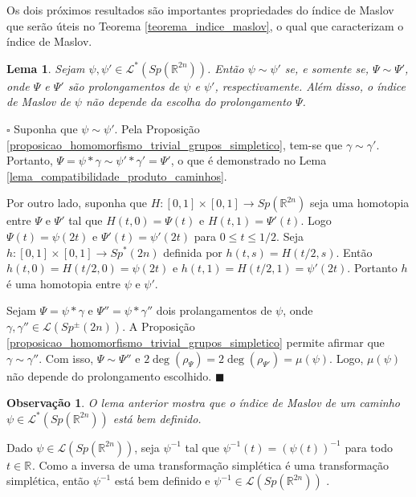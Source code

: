 \documentclass[12pt]{book}
\newtheorem{lema}[teorema]{Lema}
\newtheorem{observacao}[teorema]{Observação}
\newenvironment{prova}[1]{$\square$ #1}{\hfill$\blacksquare$}
\newcommand{\caminhos}{\mathcal{L}}
\newcommand{\dominioMaslov}{\caminhos^{*}(\gruposimpletico{\real{2n}})}
\newcommand{\gruposimpletico}[1]{Sp(#1)}
\newcommand{\gruposimpleticonaodegenerado}[1]{Sp^{#1}(2n)}
\newcommand{\intervalo}{[0,1]}
\newcommand{\real}[1]{\mathbb{R}^{#1}}
\newcommand{\reta}{\real{}}
\begin{document}
	Os dois próximos resultados são importantes propriedades do índice de Maslov que serão úteis no Teorema \ref{teorema_indice_maslov}, o qual  que caracterizam o índice de Maslov.
	
	\begin{lema}\label{lema_independencia_prolongamento}
		Sejam $\psi,\psi' \in  \dominioMaslov$. Então $\psi \sim \psi'$ se, e somente se, $\Psi \sim \Psi'$, onde $\Psi$ e $\Psi'$ são prolongamentos de $\psi$ e $\psi'$, respectivamente. Além disso, o índice de Maslov de $\psi$ não depende da escolha do prolongamento $\Psi$.
	\end{lema}
	\begin{prova}
		Suponha que $\psi \sim \psi'$. Pela Proposição \ref{proposicao_homomorfismo_trivial_grupos_simpletico}, tem-se que $\gamma\sim \gamma'$. Portanto, $\Psi = \psi*\gamma \sim \psi'*\gamma' = \Psi'$, o que é demonstrado no Lema \ref{lema_compatibilidade_produto_caminhos}. 
		
		Por outro lado, suponha que $H: \intervalo \times \intervalo \to \gruposimpletico{\real{2n}}$ seja uma homotopia entre $\Psi $ e $\Psi'$ tal que $H(t,0) = \Psi(t)$ e $H(t,1) = \Psi'(t)$. Logo $\Psi(t) = \psi(2t)$ e $\Psi'(t) = \psi'(2t)$ para $0 \leq t \leq 1/2$. Seja $h: \intervalo \times \intervalo \to \gruposimpleticonaodegenerado{*}$ definida por $h(t,s) = H(t/2, s)$. Então  $h(t,0) = H(t/2, 0) =  \psi(2t)$ e $h(t,1)=H(t/2,1) = \psi'(2t)$. Portanto $h$ é uma homotopia entre $\psi$ e $\psi'$.
		
		Sejam $\Psi=\psi*\gamma$ e $\Psi''=\psi*\gamma''$ dois prolangamentos de $\psi$, onde $\gamma, \gamma''\in \caminhos(\gruposimpleticonaodegenerado{\pm})$. A Proposição \ref{proposicao_homomorfismo_trivial_grupos_simpletico} permite afirmar que $\gamma\sim \gamma''$. Com isso, $\Psi\sim \Psi''$ e $2\deg(\rho_{\Psi})=2\deg(\rho_{\Psi'})=\mu(\psi)$. Logo, $\mu(\psi)$ não depende do prolongamento escolhido.
	\end{prova}
	
	\begin{observacao}
		O lema anterior mostra que o índice de Maslov de um caminho $\psi\in \dominioMaslov$ está bem definido.
	\end{observacao}
	
	Dado $\psi\in \caminhos(\gruposimpletico{\real{2n}})$, seja $\psi^{-1}$ tal que $\psi^{-1}(t) = (\psi(t))^{-1}$ para todo $t\in \reta$. Como a inversa de uma transformação simplética é uma transformação simplética, então $\psi^{-1}$ está bem definido e $\psi^{-1} \in \caminhos(\gruposimpletico{\real{2n}})$ .
	
\end{document}

